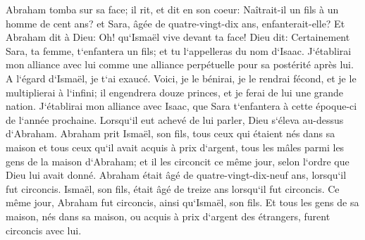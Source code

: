 \verse Abraham tomba sur sa face; il rit, et dit en son coeur: Naîtrait-il un fils à un homme de cent ans? et Sara, âgée de quatre-vingt-dix ans, enfanterait-elle? 
\verse Et Abraham dit à Dieu: Oh! qu`Ismaël vive devant ta face! 
\verse Dieu dit: Certainement Sara, ta femme, t`enfantera un fils; et tu l`appelleras du nom d`Isaac. J`établirai mon alliance avec lui comme une alliance perpétuelle pour sa postérité après lui. 
\verse A l`égard d`Ismaël, je t`ai exaucé. Voici, je le bénirai, je le rendrai fécond, et je le multiplierai à l`infini; il engendrera douze princes, et je ferai de lui une grande nation. 
\verse J`établirai mon alliance avec Isaac, que Sara t`enfantera à cette époque-ci de l`année prochaine. 
\verse Lorsqu`il eut achevé de lui parler, Dieu s`éleva au-dessus d`Abraham. 
\verse Abraham prit Ismaël, son fils, tous ceux qui étaient nés dans sa maison et tous ceux qu`il avait acquis à prix d`argent, tous les mâles parmi les gens de la maison d`Abraham; et il les circoncit ce même jour, selon l`ordre que Dieu lui avait donné. 
\verse Abraham était âgé de quatre-vingt-dix-neuf ans, lorsqu`il fut circoncis. 
\verse Ismaël, son fils, était âgé de treize ans lorsqu`il fut circoncis. 
\verse Ce même jour, Abraham fut circoncis, ainsi qu`Ismaël, son fils. 
\verse Et tous les gens de sa maison, nés dans sa maison, ou acquis à prix d`argent des étrangers, furent circoncis avec lui. 

\chapter{}

